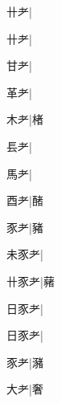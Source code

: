 \begin{multicols}{2}
{{卄耂}\mktsJzrVerticalBar{}{\cjk{}{\cnsym{}　}{\cnsym{}　}{\cnsym{}　}}|{}\par
{卄耂}\mktsJzrVerticalBar{}{\cjk{}{\cnsym{}　}{\cnsym{}　}{\cnsym{}　}}|{}\par
{\cjk{}{\cnsym{}　}甘耂}\mktsJzrVerticalBar{}{\cjk{}{\cnsym{}　}{\cnsym{}　}{\cnsym{}　}}|{}\par
{\cjk{}{\cnsym{}　}革耂}\mktsJzrVerticalBar{}{\cjk{}{\cnsym{}　}{\cnsym{}　}{\cnsym{}　}}|{}\par
{\cjk{}{\cnsym{}　}木耂}\mktsJzrVerticalBar{}{\cjk{}{\cnsym{}　}{\cnsym{}　}{\cnsym{}　}}|{\cjk{}楮}\par
{\cjk{}{\cnsym{}　}镸耂}\mktsJzrVerticalBar{}{\cjk{}{\cnsym{}　}{\cnsym{}　}{\cnsym{}　}}|{}\par
{\cjk{}{\cnsym{}　}馬耂}\mktsJzrVerticalBar{}{\cjk{}{\cnsym{}　}{\cnsym{}　}{\cnsym{}　}}|{}\par
{\cjk{}{\cnsym{}　}酉耂}\mktsJzrVerticalBar{}{\cjk{}{\cnsym{}　}{\cnsym{}　}{\cnsym{}　}}|{\cjk{}醏}\par
{\cjk{}{\cnsym{}　}豕耂}\mktsJzrVerticalBar{}{\cjk{}{\cnsym{}　}{\cnsym{}　}{\cnsym{}　}}|{\cjk{}豬}\par
{\cjk{}未豕耂}\mktsJzrVerticalBar{}{\cjk{}{\cnsym{}　}{\cnsym{}　}{\cnsym{}　}}|{}\par
{\cjk{}卄豕耂}\mktsJzrVerticalBar{}{\cjk{}{\cnsym{}　}{\cnsym{}　}{\cnsym{}　}}|{\cjk{}藸}\par
{\cjk{}日豕耂}\mktsJzrVerticalBar{}{\cjk{}{\cnsym{}　}{\cnsym{}　}{\cnsym{}　}}|{}\par
{\cjk{}日豕耂}\mktsJzrVerticalBar{}{\cjk{}{\cnsym{}　}{\cnsym{}　}{\cnsym{}　}}|{}\par
{豕耂}\mktsJzrVerticalBar{}{\cjk{}{\cnsym{}　}{\cnsym{}　}{\cnsym{}　}}|{\cjk{}瀦}\par
{\cjk{}{\cnsym{}　}大耂}\mktsJzrVerticalBar{}{\cjk{}{\cnsym{}　}{\cnsym{}　}{\cnsym{}　}}|{\cjk{}奢}\par
}
\end{multicols}
